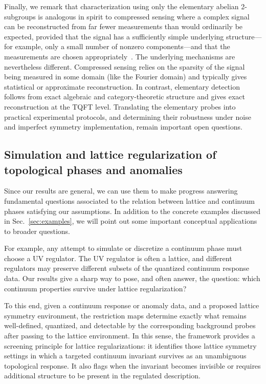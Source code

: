 \documentclass[aps,prx,reprint,superscriptaddress,twocolumn,amsmath,amssymb,amsfonts, nofootinbib]{revtex4-2}
\theoremstyle{apsstyle}
\begin{document}
 Finally, we remark that characterization using only the elementary abelian 2-subgroups is analogous in spirit to compressed sensing where a complex signal can be reconstructed from far fewer measurements than would ordinarily be expected, provided that the signal has a sufficiently simple underlying structure---for example, only a small number of nonzero components---and that the measurements are chosen appropriately~\cite{CandesRombergTao2006,Donoho2006,CandesWakin2008}. The underlying mechanisms are nevertheless different. Compressed sensing relies on the sparsity of the signal being measured in some domain (like the Fourier domain) and typically gives statistical or approximate reconstruction. In contrast, elementary detection follows from exact algebraic and category-theoretic structure and gives exact reconstruction at the TQFT level. Translating the elementary probes into practical experimental protocols, and determining their robustness under noise and imperfect symmetry implementation, remain important open questions.






\subsection{Simulation and lattice regularization of topological phases and anomalies}
Since our results are general, we can use them to make progress answering fundamental questions associated to the relation between lattice and continuum phases satisfying our assumptions. In addition to the concrete examples discussed in Sec.~\ref{sec:examples}, we will point out some important conceptual applications to broader questions.


For example, any attempt to simulate or discretize a continuum phase must choose a UV regulator. The UV regulator is often a lattice, and different regulators may preserve different subsets of the quantized continuum response data. Our results give a sharp way to pose, and often answer, the question: which continuum properties survive under lattice regularization? 

To this end, given a continuum response or anomaly data, and a proposed lattice symmetry environment, the restriction maps determine exactly what remains well-defined, quantized, and detectable by the corresponding background probes after passing to the lattice environment. In this sense, the framework provides a screening principle for lattice regularizations: it identifies those lattice symmetry settings in which a targeted continuum invariant survives as an unambiguous topological response. It also flags when the invariant becomes invisible or requires additional structure to be present in the regulated description. 
\end{document}
